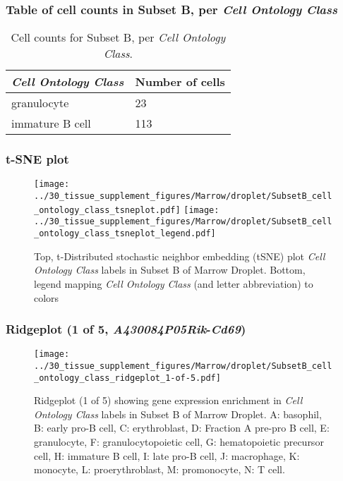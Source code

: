 \subsubsection{Table of cell counts in Subset B, per \emph{Cell Ontology Class}}\begin{table}[h]
\centering
\label{my-label}
\begin{tabular}{@{}ll@{}}
\toprule

\emph{Cell Ontology Class}& Number of cells \\ \midrule
granulocyte & 23 \\

immature B cell & 113 \\
\bottomrule
\end{tabular}
\caption{Cell counts for Subset B, per \emph{Cell Ontology Class}.}
\end{table}

\clearpage
\subsubsection{t-SNE plot}
\begin{figure}[h]
\centering
\texttt{[image: ../30\_tissue\_supplement\_figures/Marrow/droplet/SubsetB\_cell\_ontology\_class\_tsneplot.pdf]}
\texttt{[image: ../30\_tissue\_supplement\_figures/Marrow/droplet/SubsetB\_cell\_ontology\_class\_tsneplot\_legend.pdf]}
\caption{Top, t-Distributed stochastic neighbor embedding (tSNE) plot  \emph{Cell Ontology Class} labels in Subset B of Marrow Droplet. Bottom, legend mapping \emph{Cell Ontology Class} (and letter abbreviation) to colors}
\end{figure}


\clearpage

\subsubsection{Ridgeplot (1 of 5, \emph{A430084P05Rik}-\emph{Cd69})}
\begin{figure}[h]
\centering
\texttt{[image: ../30\_tissue\_supplement\_figures/Marrow/droplet/SubsetB\_cell\_ontology\_class\_ridgeplot\_1-of-5.pdf]}

\caption{ Ridgeplot (1 of 5)  showing gene expression enrichment in \emph{Cell Ontology Class} labels in Subset B of Marrow Droplet. A: basophil, B: early pro-B cell, C: erythroblast, D: Fraction A pre-pro B cell, E: granulocyte, F: granulocytopoietic cell, G: hematopoietic precursor cell, H: immature B cell, I: late pro-B cell, J: macrophage, K: monocyte, L: proerythroblast, M: promonocyte, N: T cell.}
\end{figure}



